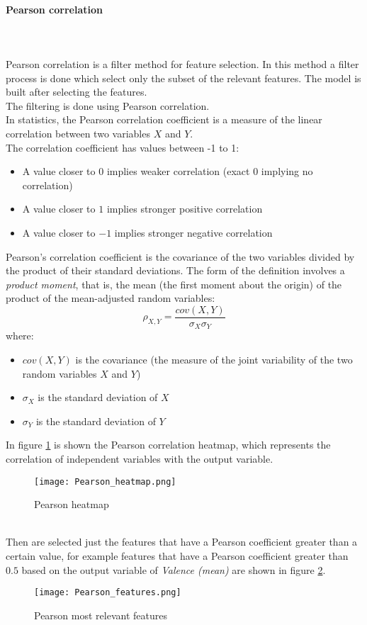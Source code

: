 \paragraph{Pearson correlation}
\mbox{} \\ \\
Pearson correlation is a filter method for feature selection. In this method a filter process is done which select only the subset of the relevant features. The model is built after selecting the features.
\\
The filtering is done using Pearson correlation.
\\ \indent
In statistics, the Pearson correlation coefficient is a measure of the linear correlation between two variables $X$ and $Y$.
\\
The correlation coefficient has values between -1 to 1:
\begin{itemize}
	\item A value closer to $0$ implies weaker correlation (exact $0$ implying no correlation)
	\item A value closer to $1$ implies stronger positive correlation
	\item A value closer to $-1$ implies stronger negative correlation
\end{itemize}
Pearson's correlation coefficient is the covariance of the two variables divided by the product of their standard deviations. The form of the definition involves a \textit{product moment}, that is, the mean (the first moment about the origin) of the product of the mean-adjusted random variables:
\begin{equation}
	\rho_{X,Y}=\dfrac{cov(X,Y)}{\sigma_X \sigma_Y}
\end{equation}
where:
\begin{itemize}
	\item $cov(X,Y)$ is the covariance (the measure of the joint variability of the two random variables $X$ and $Y$)
	\item $\sigma_X$ is the standard deviation of $X$
	\item $\sigma_Y$ is the standard deviation of $Y$
\end{itemize}
In figure \ref{fig:Pearson_heatmap} is shown the Pearson correlation heatmap, which represents the correlation of independent variables with the output variable.
\begin{figure}[h]
    \centering
    \texttt{[image: Pearson\_heatmap.png]} 
	\caption{Pearson heatmap}
    \label{fig:Pearson_heatmap}
\end{figure}
\\
Then are selected just the features that have a Pearson coefficient greater than a certain value, for example features that have a Pearson coefficient greater than $0.5$ based on the output variable of \textit{Valence (mean)} are shown in figure \ref{fig:Pearson_features}.
\begin{figure}[h]
    \centering
    \texttt{[image: Pearson\_features.png]} 
	\caption{Pearson most relevant features}
    \label{fig:Pearson_features}
\end{figure}

